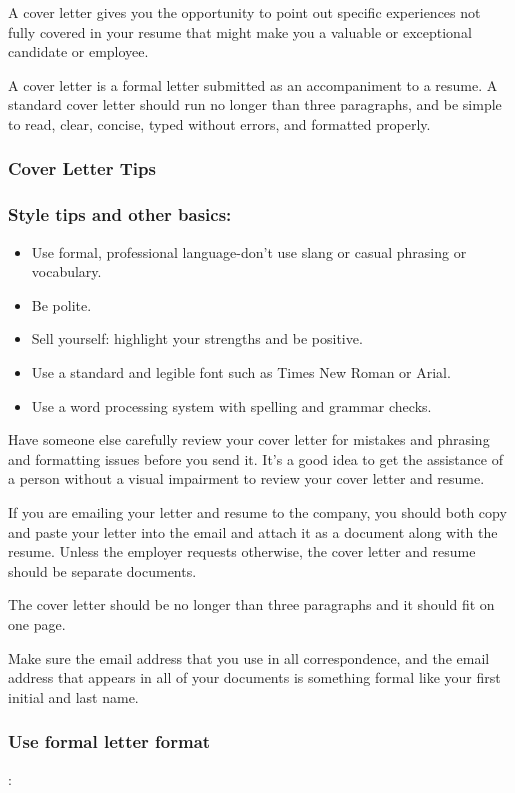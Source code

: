 A cover letter gives you the opportunity to point out specific experiences not fully covered in your resume that might make you a valuable or exceptional candidate or employee.

A cover letter is a formal letter submitted as an accompaniment to a resume. A standard cover letter should run no longer than three paragraphs, and be simple to read, clear, concise, typed without errors, and formatted properly.

\subsubsection*{Cover Letter Tips}
\subsubsection*{Style tips and other basics:}
\begin{itemize}[leftmargin=1.0cm]
	\item Use formal, professional language-don't use slang or casual phrasing or vocabulary.
	\item Be polite.
	\item Sell yourself: highlight your strengths and be positive.
	\item Use a standard and legible font such as Times New Roman or Arial.
	\item Use a word processing system with spelling and grammar checks.
\end{itemize}
Have someone else carefully review your cover letter for mistakes and phrasing and formatting issues before you send it. It's a good idea to get the assistance of a person without a visual impairment to review your cover letter and resume.

If you are emailing your letter and resume to the company, you should both copy and paste your letter into the email and attach it as a document along with the resume. Unless the employer requests otherwise, the cover letter and resume should be separate documents.

The cover letter should be no longer than three paragraphs and it should fit on one page.

Make sure the email address that you use in all correspondence, and the email address that appears in all of your documents is something formal like your first initial and last name.

\subsubsection*{Use formal letter format}:

